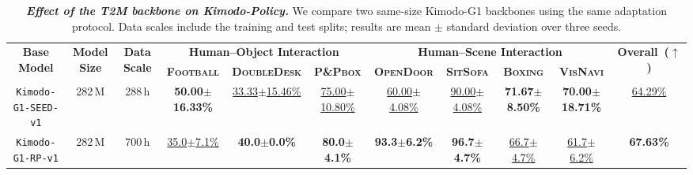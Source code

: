 \begin{table}[H]
  \setlength{\belowcaptionskip}{6pt}
  \caption{
    \textbf{\textit{Effect of the T2M backbone on Kimodo-Policy.}} We compare two same-size Kimodo-G1 backbones using the same adaptation protocol. Data scales include the training and test splits; results are mean $\pm$ standard deviation over three seeds.}
  \label{tab:t2m_dependency}
  \centering
  \begin{adjustbox}{max width=\textwidth}
  \setlength{\tabcolsep}{3.8pt}
  \renewcommand{\arraystretch}{1.08}

  \begin{tabular}{cccccc|ccccc}
  \toprule
  \multirow{2}{*}{\textbf{Base Model}} &
  \multirow{2}{*}{\textbf{Model Size}} &
  \multirow{2}{*}{\textbf{Data Scale}} &
  \multicolumn{3}{c|}{\textbf{Human--Object Interaction}} &
  \multicolumn{4}{c}{\textbf{Human--Scene Interaction}} &
  \multirow{2}{*}{\textbf{Overall~($\uparrow$)}} \\
  \cmidrule(lr){4-6}
  \cmidrule(lr){7-10}

  & & &
  \textbf{\textsc{Football}} &
  \textbf{\textsc{DoubleDesk}} &
  \textbf{\textsc{P\&Pbox}} &
  \textbf{\textsc{OpenDoor}} &
  \textbf{\textsc{SitSofa}} &
  \textbf{\textsc{Boxing}} &
  \textbf{\textsc{VisNavi}} \\
  \midrule

  \texttt{Kimodo-G1-SEED-v1}
  & 282\,M
  & 288\,h
  & \textbf{50.00$\pm$16.33\%}
  & \underline{33.33$\pm$15.46\%}
  & \underline{75.00$\pm$10.80\%}
  & \underline{60.00$\pm$4.08\%}
  & \underline{90.00$\pm$4.08\%}
  & \textbf{71.67$\pm$8.50\%}
  & \textbf{70.00$\pm$18.71\%}
  & \underline{64.29\%} \\

  \rowcolor{hclbrown!8!white}
  \texttt{Kimodo-G1-RP-v1}
  & 282\,M
  & 700\,h
  & \underline{35.0$\pm$7.1\%}
  & \textbf{40.0$\pm$0.0\%}
  & \textbf{80.0$\pm$4.1\%}
  & \textbf{93.3$\pm$6.2\%}
  & \textbf{96.7$\pm$4.7\%}
  & \underline{66.7$\pm$4.7\%}
  & \underline{61.7$\pm$6.2\%}
  & \textbf{67.63\%} \\

  \bottomrule
  \end{tabular}
  \end{adjustbox}
\end{table}
